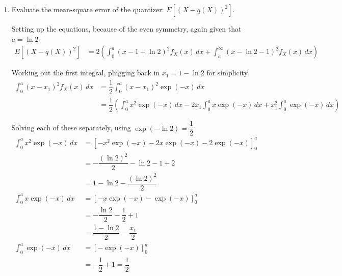 \documentclass[11pt]{article}
\begin{document}
\begin{enumerate}[label=(\alph*)]
\begin{solution}
        And given the symmetry of this equation around $x = 0$. \\
        For $(-\infty, -a]$, $x_1 = - \ln{2} - 1$ \\
        For $(-a, 0]$, $x_1 = \ln{2} - 1$ \\
        For $[0, a)$, $x_1 = 1 - \ln{2}$ \\
        For $[a, \infty)$, $x_1 = \ln{2} + 1$

    \end{solution}
    \vspace{5em}

    \item Evaluate the mean-square error of the quantizer: $E[(X - q(X))^2]$.
    \begin{solution}

        Setting up the equations, because of the even symmetry, again given that $a = \ln{2}$
        \begin{align*}
            E[(X - q(X))^2] &= 2\left(\int_0^a (x - 1 + \ln{2})^2 f_X(x)\, dx + \int_a^\infty (x - \ln{2} - 1)^2 f_X(x)\, dx\right)
        \end{align*}

        Working out the first integral, plugging back in $x_1 = 1 - \ln{2}$ for simplicity.
        \begin{align*}
            \int_0^a (x - x_1)^2 f_X(x)\, dx &= \dfrac{1}{2} \int_0^a (x - x_1)^2 \exp(-x)\, dx \\
            &= \dfrac{1}{2} \left( \int_0^a x^2 \exp(-x)\, dx - 2x_1 \int_0^a x \exp(-x)\, dx + x_1^2 \int_0^a \exp(-x)\, dx \right)
        \end{align*}

        Solving each of these separately, using $\exp(-\ln{2}) = \dfrac{1}{2}$
        \begin{align*}
            \int_0^a x^2 \exp(-x)\, dx &= \left[ -x^2 \exp(-x) - 2x \exp(-x) - 2\exp(-x) \right]_{0}^{a} \\
            &= -\dfrac{(\ln{2})^2}{2} - \ln{2} - 1 + 2 \\
            &= 1 - \ln{2} - \dfrac{(\ln{2})^2}{2} \\[1em]
            \int_0^a x \exp(-x)\, dx &= \left[ -x \exp(-x) - \exp(-x) \right]_{0}^{a} \\
            &= -\dfrac{\ln{2}}{2} - \dfrac{1}{2} + 1 \\
            &= \dfrac{1 - \ln{2}}{2} = \dfrac{x_1}{2} \\[1em]
            \int_0^a \exp(-x)\, dx &= \left[ -\exp(-x) \right]_{0}^{a} \\
            &= -\dfrac{1}{2} + 1 = \dfrac{1}{2}
        \end{align*}


\end{solution}
\end{enumerate}
\end{document}
